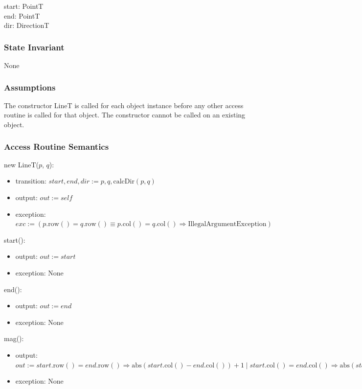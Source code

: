 \documentclass[12pt]{article}
\newcommand{\Implies}{\Rightarrow}
\begin{document}
start: PointT\\
end: PointT\\
dir: DirectionT

\subsubsection* {State Invariant}

None

\subsubsection* {Assumptions}

The constructor LineT is called for each object instance before any other
access routine is called for that object.  The constructor cannot be called on
an existing object.

\subsubsection* {Access Routine Semantics}

new LineT($p$, $q$):
\begin{itemize}
	\item transition: $start, end, dir := p, q, \mbox{calcDir}(p, q)$
	\item output: $out := \mathit{self}$
	\item exception: $exc := (p.\mbox{row}() = q.\mbox{row}() \equiv p.\mbox{col}() = q.\mbox{col}() \Implies \mbox{IllegalArgumentException})$
	
\end{itemize}

\noindent start():
\begin{itemize}
	\item output: $out := start$
	\item exception: None
\end{itemize}

\noindent end():
\begin{itemize}
	\item output: $out := end$
	\item exception: None
\end{itemize}

\noindent mag():
\begin{itemize}
	\item output: $out := start.\mbox{row}() = end.\mbox{row}() \Implies \mbox{abs}(start.\mbox{col}() - end.\mbox{col}()) + 1 \mid start.\mbox{col}() = end.\mbox{col}() \Implies \mbox{abs}(start.\mbox{row}() - end.\mbox{row}()) + 1$
	\item exception: None
\end{itemize}
\end{document}
